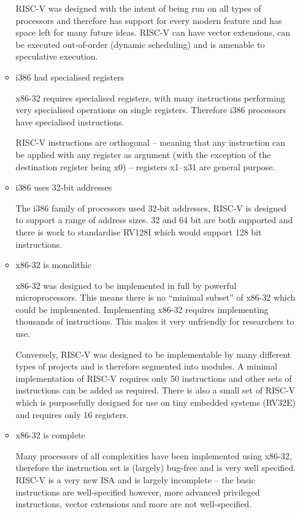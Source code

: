 \documentclass[10pt,\jkfside,a4paper]{article}
\begin{document}
\begin{enumerate}
\begin{itemize}
RISC-V was designed with the intent of being run on all types of processors
and therefore has support for every modern feature and has space left for
many future ideas. RISC-V can have vector extensions, can be executed
out-of-order (dynamic scheduling) and is amenable to speculative execution.

\item i386 had specialised registers

x86-32 requires specialised registers, with many instructions performing very
specialised operations on single registers. Therefore i386 processors have
specialised instructions.

RISC-V instructions are orthogonal -- meaning that any instruction can be
applied with any register as argument (with the exception of the
destination register being x0) -- registers x1--x31 are general purpose.

\item i386 uses 32-bit addresses

The i386 family of processors used 32-bit addresses, RISC-V is designed to
support a range of address sizes. 32 and 64 bit are both supported and there
is work to standardise RV128I which would support 128 bit instructions.

\item x86-32 is monolithic

x86-32 was designed to be implemented in full by powerful microprocessors.
This means there is no ``minimal subset'' of x86-32 which could be
implemented. Implementing x86-32 requires implementing thousands of
instructions. This makes it very unfriendly for researchers to use.

Conversely, RISC-V was designed to be implementable by many different types
of projects and is therefore segmented into modules. A minimal
implementation of RISC-V requires only 50 instructions and other sets of
instructions can be added as required. There is also a small set of RISC-V
which is purposefully designed for use on tiny embedded systems (RV32E) and
requires only 16 registers.

\item x86-32 is complete

Many processors of all complexities have been implemented using x86-32,
therefore the instruction set is (largely) bug-free and is very well
specified. RISC-V is a very new ISA and is largely incomplete -- the basic
instructions are well-specified however, more advanced privileged
instructions, vector extensions and more are not well-specified.

\end{itemize}

\end{enumerate}
\end{document}
